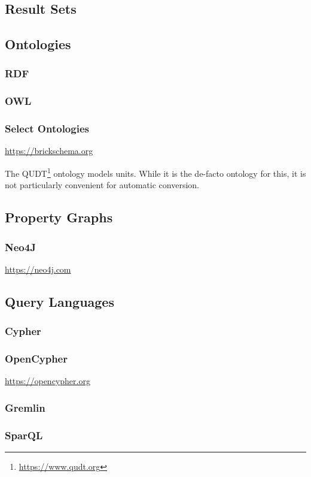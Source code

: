 

\subsection{Result Sets}



\subsection{Ontologies}
\subsubsection{RDF}
\subsubsection{OWL}
\subsubsection{Select Ontologies}

\url{https://brickschema.org}



The QUDT\footnote{\url{https://www.qudt.org}} ontology models units. While it is the de-facto ontology for this, it is not particularly convenient for automatic conversion.

\subsection{Property Graphs}
\subsubsection{Neo4J}

\url{https://neo4j.com}

\subsection{Query Languages}
\subsubsection{Cypher}
\subsubsection{OpenCypher}

\url{https://opencypher.org}

\subsubsection{Gremlin}
\subsubsection{SparQL}


